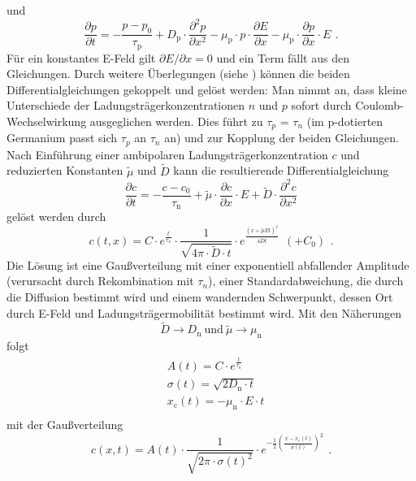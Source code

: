 und
\begin{equation}
\label{}
\frac{\partial p}{\partial t}=
-\frac{p-p_0}{\tau_{\text{p}}}
+ D_{\text{p}} \cdot \frac{\partial^2 p}{\partial x^2}
- \mu_{\text{p}} \cdot p \cdot \frac{\partial E}{\partial x}
- \mu_{\text{p}} \cdot \frac{\partial p}{\partial x} \cdot E \ \,.
\end{equation} 
Für ein konstantes E-Feld gilt $\partial E / \partial x = 0$ und ein Term fällt aus den Gleichungen.
Durch weitere Überlegungen (siehe \cite{staatsex}) können die beiden Differentialgleichungen
gekoppelt und gelöst werden:
Man nimmt an, dass kleine Unterschiede der Ladungsträgerkonzentrationen $n$ und $p$
sofort durch Coulomb-Wechselwirkung ausgeglichen werden. Dies führt zu $\tau_p$ = $\tau_n$
(im p-dotierten Germanium passt sich $\tau_p$ an $\tau_n$ an)
und zur Kopplung der beiden Gleichungen.\\
Nach Einführung einer ambipolaren Ladungsträgerkonzentration $c$ und reduzierten Konstanten
$\tilde{\mu}$ und $\tilde{D}$ kann die resultierende Differentialgleichung
\begin{equation}
\label{}
\frac{\partial c}{\partial t}=
-\frac{c-c_0}{\tau_{\text{n}}}
+ \tilde{\mu} \cdot \frac{\partial c}{\partial x} \cdot E
+ \tilde{D} \cdot \frac{\partial^2 c}{\partial x^2}
\end{equation}
gelöst werden durch
\begin{equation}
\label{}
c(t,x) = C \cdot e^{\frac{t}{\tau_n}}
\cdot
\frac{1}{\sqrt{4  \pi  \cdot \tilde{D}  \cdot t}}
\cdot
e^{\frac{(x + \tilde{\mu} E t)^2}{4 \tilde{D}  t}}
\ \ (+ C_0) \ \, .
\end{equation}
Die Lösung ist eine Gaußverteilung mit einer exponentiell abfallender Amplitude
(verursacht durch Rekombination mit $\tau_n$),
einer Standardabweichung, die durch die Diffusion bestimmt wird
und einem wandernden Schwerpunkt, dessen Ort durch E-Feld und Ladungsträgermobilität bestimmt wird.
Mit den Näherungen
\begin{equation}
\label{}
\tilde{D} \rightarrow D_{\text{n}} \ \text{und} \ \tilde{\mu} \rightarrow \mu_{\text{n}}
\end{equation}
folgt
\begin{equation}
\label{}
\begin{split}
& A(t) = C \cdot e^{\frac{t}{\tau_n}}\\
& \sigma(t) = \sqrt{2 D_{\text{n}} \cdot t}\\
& x_{\text{c}}(t) = - \mu_{\text{n}} \cdot E \cdot t\\
\end{split}
\end{equation}
mit der Gaußverteilung
\begin{equation}
\label{}
c(x,t) = A(t) \cdot \frac{1}{\sqrt{2 \pi \cdot \sigma(t)^2}} \cdot
e^{-\frac{1}{2} (\frac{x-x_{\text{c}}(t)}{\sigma(t)})^2} \ \, .
\end{equation}


